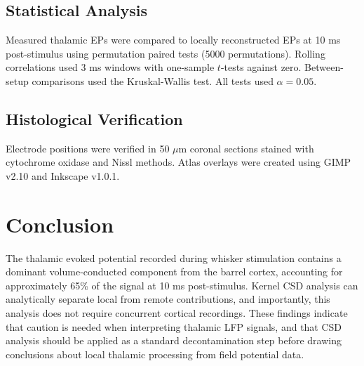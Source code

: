 \documentclass[11pt]{article}
\begin{document}
\subsection{Statistical Analysis}

Measured thalamic EPs were compared to locally reconstructed EPs at 10 ms post-stimulus using permutation paired tests (5000 permutations). Rolling correlations used 3 ms windows with one-sample $t$-tests against zero. Between-setup comparisons used the Kruskal-Wallis test. All tests used $\alpha = 0.05$.

\subsection{Histological Verification}

Electrode positions were verified in 50 $\mu$m coronal sections stained with cytochrome oxidase and Nissl methods. Atlas overlays were created using GIMP v2.10 and Inkscape v1.0.1.

\section{Conclusion}

The thalamic evoked potential recorded during whisker stimulation contains a dominant volume-conducted component from the barrel cortex, accounting for approximately 65\% of the signal at 10 ms post-stimulus. Kernel CSD analysis can analytically separate local from remote contributions, and importantly, this analysis does not require concurrent cortical recordings. These findings indicate that caution is needed when interpreting thalamic LFP signals, and that CSD analysis should be applied as a standard decontamination step before drawing conclusions about local thalamic processing from field potential data.


\end{document}
